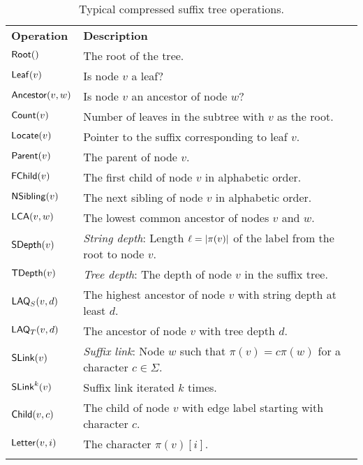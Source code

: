 \begin{table*}
\centering{}
\caption{Typical compressed suffix tree operations.}\label{table:cst
operations}

\begin{tabular}{ll}
\hline
\noalign{\smallskip}
\textbf{Operation}  & \textbf{Description} \\
\noalign{\smallskip}
\hline
\noalign{\smallskip}
$\mathsf{Root}()$          & The root of the tree. \\
$\mathsf{Leaf}(v)$         & Is node $v$ a leaf? \\
$\mathsf{Ancestor}(v,w)$   & Is node $v$ an ancestor of node $w$? \\
\noalign{\smallskip}
$\mathsf{Count}(v)$        & Number of leaves in the subtree with $v$ as the root. \\
$\mathsf{Locate}(v)$       & Pointer to the suffix corresponding to leaf $v$. \\
\noalign{\smallskip}
$\mathsf{Parent}(v)$       & The parent of node $v$. \\
$\mathsf{FChild}(v)$       & The first child of node $v$ in alphabetic order. \\
$\mathsf{NSibling}(v)$     & The next sibling of node $v$ in alphabetic order. \\
$\mathsf{LCA}(v,w)$        & The lowest common ancestor of nodes $v$ and $w$. \\
\noalign{\smallskip}
$\mathsf{SDepth}(v)$       & \emph{String depth}: Length $\ell = \lvert \pi(v) \rvert$ of the
label from the root to node $v$. \\
$\mathsf{TDepth}(v)$       & \emph{Tree depth}: The depth of node $v$ in the suffix
tree. \\
$\mathsf{LAQ}_{S}(v,d)$    & The highest ancestor of node $v$ with string depth at
least $d$. \\
$\mathsf{LAQ}_{T}(v,d)$    & The ancestor of node $v$ with tree depth $d$. \\
\noalign{\smallskip}
$\mathsf{SLink}(v)$        & \emph{Suffix link}: Node $w$ such that $\pi(v) = c \pi(w)$ for
a character $c \in \Sigma$. \\
$\mathsf{SLink}^{k}(v)$    & Suffix link iterated $k$ times. \\
\noalign{\smallskip}
$\mathsf{Child}(v,c)$      & The child of node $v$ with edge label starting with
character $c$. \\
$\mathsf{Letter}(v,i)$     & The character $\pi(v)[i]$. \\
\noalign{\smallskip}
\hline
\end{tabular}
\end{table*}

